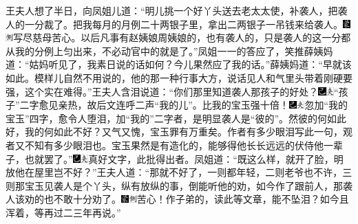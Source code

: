 王夫人想了半日，向凤姐儿道：“明儿挑一个好丫头送去老太太使，补袭人，把袭人的一分裁了。把我每月的月例二十两银子里，拿出二两银子一吊钱来给袭人。{\includegraphics[width=3mm]{../Images/00006}\includegraphics[width=3mm]{../Images/00011}\footnotesize \kaishu 写尽慈母苦心。}以后凡事有赵姨娘周姨娘的，也有袭人的，只是袭人的这一分都从我的分例上匀出来，不必动官中的就是了。”凤姐一一的答应了，笑推薛姨妈道：“姑妈听见了，我素日说的话如何？今儿果然应了我的话。”薛姨妈道：“早就该如此。模样儿自然不用说的，他的那一种行事大方，说话见人和气里头带着刚硬要强，这个实在难得。”王夫人含泪说道：“你们那里知道袭人那孩子的好处？{\includegraphics[width=3mm]{../Images/00003}\includegraphics[width=3mm]{../Images/00012}\footnotesize \kaishu “孩子”二字愈见亲热，故后文连呼二声“我的儿”。}比我的宝玉强十倍！{\includegraphics[width=3mm]{../Images/00003}\includegraphics[width=3mm]{../Images/00012}\footnotesize \kaishu 忽加“我的宝玉”四字，愈令人堕泪，加“我的”二字者，是明显袭人是“彼的”。然彼的何如此好，我的何如此不好？又气又愧，宝玉罪有万重矣。作者有多少眼泪写此一句，观者又不知有多少眼泪也。}宝玉果然是有造化的，能够得他长长远远的伏侍他一辈子，也就罢了。”{\includegraphics[width=3mm]{../Images/00003}\includegraphics[width=3mm]{../Images/00012}\footnotesize \kaishu 真好文字，此批得出者。}凤姐道：“既这么样，就开了脸，明放他在屋里岂不好？”王夫人道：“那就不好了，一则都年轻，二则老爷也不许，三则那宝玉见袭人是个丫头，纵有放纵的事，倒能听他的劝，如今作了跟前人，那袭人该劝的也不敢十分劝了。{\includegraphics[width=3mm]{../Images/00006}\includegraphics[width=3mm]{../Images/00011}\footnotesize \kaishu 苦心！作子弟的，读此等文章，能不坠泪？}如今且浑着，等再过二三年再说。”


